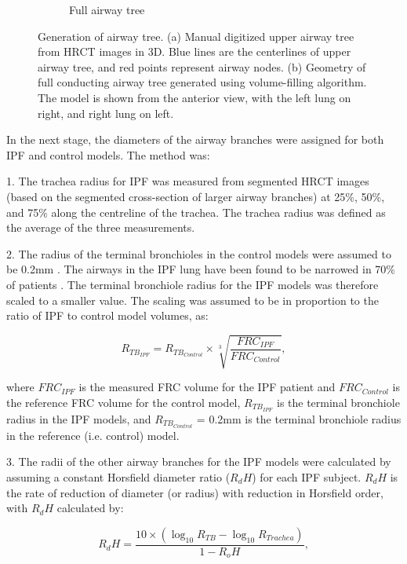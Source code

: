 \begin{figure}[htbp]
\begin{subfigure}{.425\linewidth}
  \caption{Full airway tree}
  \label{fig:AirwayGeneration-b} 
\end{subfigure}
\caption{Generation of airway tree. (a) Manual digitized upper airway tree from HRCT images in 3D. Blue lines are the centerlines of upper airway tree, and red points represent airway nodes. (b) Geometry of full conducting airway tree generated using volume-filling algorithm. The
model is shown from the anterior view, with the left lung on right, and right lung on left.} 
\label{fig:AirwayGeneration}
\end{figure}

In the next stage, the diameters of the airway branches were assigned for both IPF and control models. The method was:

1. The trachea radius for IPF was measured from segmented HRCT images (based on the segmented cross-section of larger airway branches) at 25\%, 50\%, and 75\% along the centreline of the trachea. The trachea radius was defined as the average of the three measurements.

2. The radius of the terminal bronchioles in the control models were assumed to be 0.2mm \citep{horsfield1976diameter}. The airways in the IPF lung have been found to be narrowed in 70\% of patients \citep{crystal1976idiopathic}. The terminal bronchiole radius for the IPF models was therefore scaled to a smaller value. The scaling was assumed to be in proportion to the ratio of IPF to control model volumes, as:

\begin{equation}
 \label{eq:NarrowedTerminalRadius}
 R_{{TB}_{IPF}} = R_{{TB}_{Control}} \times \sqrt[3]{\frac{FRC_{IPF}}{FRC_{Control}}},
\end{equation}

\noindent where $FRC_{IPF}$ is the measured FRC volume for the IPF patient and $FRC_{Control}$ is the reference FRC volume for the control model, $R_{{TB}_{IPF}}$ is the terminal bronchiole radius in the IPF models, and $R_{{TB}_{Control}}$ = 0.2mm is the terminal bronchiole radius in the reference (i.e. control) model.  

3. The radii of the other airway branches for the IPF models were calculated by assuming a constant Horsfield diameter ratio ($R_dH$) for each IPF subject. $R_dH$ is the rate of reduction of diameter (or radius) with reduction in Horsfield order, with $R_dH$ calculated by:

\begin{equation}
 \label{eq:HorsfieldRadiusRatio}
 R_dH = \frac{10 \times (\log_{10}R_{TB} - \log_{10}R_{Trachea})}{1-R_oH},
\end{equation}


